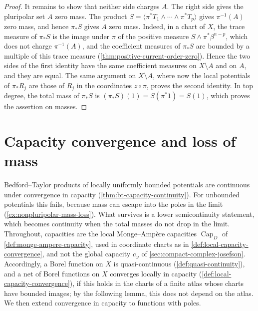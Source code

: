 \begin{proof}
It remains to show that neither side charges $A$. The right side gives the pluripolar set $A$ zero mass. The product $S=\langle\pi^*T_1\wedge\cdots\wedge\pi^*T_p\rangle$ gives $\pi^{-1}(A)$ zero mass, and hence $\pi_*S$ gives $A$ zero mass. Indeed, in a chart of $X$, the trace measure of $\pi_*S$ is the image under $\pi$ of the positive measure $S\wedge\pi^*\beta^{n-p}$, which does not charge $\pi^{-1}(A)$, and the coefficient measures of $\pi_*S$ are bounded by a multiple of this trace measure (\cref{thm:positive-current-order-zero}). Hence the two sides of the first identity have the same coefficient measures on $X\setminus A$ and on $A$, and they are equal. The same argument on $X\setminus A$, where now the local potentials of $\pi_*R_j$ are those of $R_j$ in the coordinates $z\circ\pi$, proves the second identity. In top degree, the total mass of $\pi_*S$ is $(\pi_*S)(1)=S(\pi^*1)=S(1)$, which proves the assertion on masses.
\end{proof}

\section{Capacity convergence and loss of mass}
\label{sec:nonpluripolar-capacity-limits}
Bedford--Taylor products of locally uniformly bounded potentials are continuous under convergence in capacity (\cref{thm:bt-capacity-continuity}). For unbounded potentials this fails, because mass can escape into the poles in the limit (\cref{ex:nonpluripolar-mass-loss}). What survives is a lower semicontinuity statement, which becomes continuity when the total masses do not drop in the limit. Throughout, capacities are the local Monge--Amp\`ere capacities $\operatorname{Cap}_D$ of \cref{def:monge-ampere-capacity}, used in coordinate charts as in \cref{def:local-capacity-convergence}, and not the global capacity $c_\omega$ of \cref{sec:compact-complex-josefson}. Accordingly, a Borel function on $X$ is quasi-continuous (\cref{def:quasi-continuity}), and a net of Borel functions on $X$ converges locally in capacity (\cref{def:local-capacity-convergence}), if this holds in the charts of a finite atlas whose charts have bounded images; by the following lemma, this does not depend on the atlas. We then extend convergence in capacity to functions with poles.

